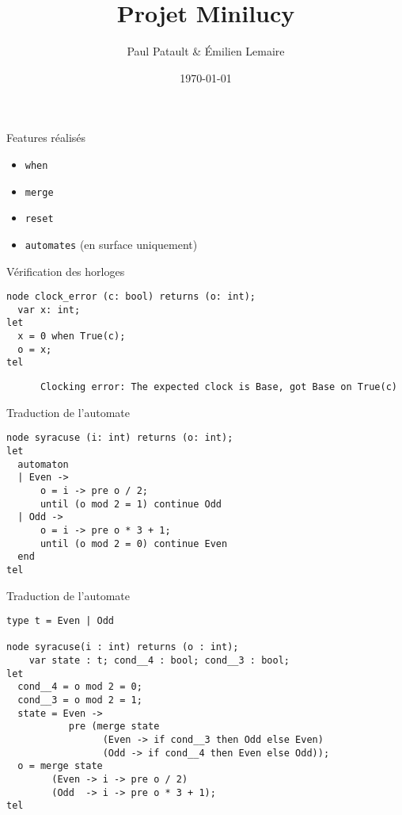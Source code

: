 \documentclass{beamer}
\title{Projet Minilucy}
\date{\today}
\author{Paul Patault \& Émilien Lemaire}
\institute{ENS Paris-Saclay}
\begin{document}
\maketitle


\begin{frame}{Features réalisés}
    \begin{itemize}[label=$\vcenter{\hbox{\scriptsize$\bullet$}}$]
        \item \texttt{when}
        \item \texttt{merge}
        \item \texttt{reset}
        \item \texttt{automates} (en surface uniquement)
    \end{itemize}
\end{frame}

\begin{frame}[fragile]{Vérification des horloges}

\begin{lstlisting}
node clock_error (c: bool) returns (o: int);
  var x: int;
let
  x = 0 when True(c);
  o = x;
tel
\end{lstlisting}

 {
     \scriptsize \color{red!80}
     \begin{verbatim}
      Clocking error: The expected clock is Base, got Base on True(c)
     \end{verbatim}
}


\end{frame}

\begin{frame}[fragile]{Traduction de l'automate}

\begin{lstlisting}
node syracuse (i: int) returns (o: int);
let
  automaton
  | Even ->
      o = i -> pre o / 2;
      until (o mod 2 = 1) continue Odd
  | Odd ->
      o = i -> pre o * 3 + 1;
      until (o mod 2 = 0) continue Even
  end
tel
\end{lstlisting}

\end{frame}

\begin{frame}[fragile]{Traduction de l'automate}

\begin{lstlisting}
type t = Even | Odd

node syracuse(i : int) returns (o : int);
    var state : t; cond__4 : bool; cond__3 : bool;
let
  cond__4 = o mod 2 = 0;
  cond__3 = o mod 2 = 1;
  state = Even ->
           pre (merge state
                 (Even -> if cond__3 then Odd else Even)
                 (Odd -> if cond__4 then Even else Odd));
  o = merge state
        (Even -> i -> pre o / 2)
        (Odd  -> i -> pre o * 3 + 1);
tel
\end{lstlisting}

\end{frame}
\end{document}
